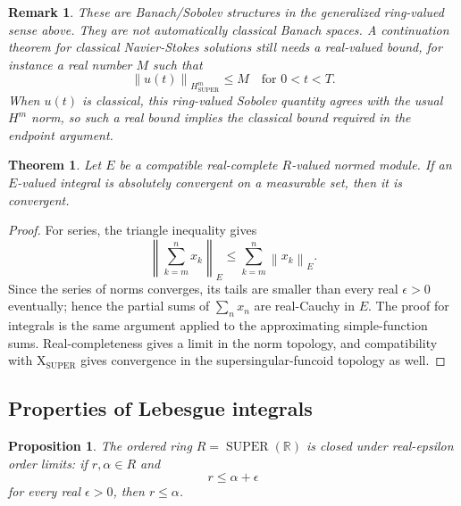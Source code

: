 \documentclass{amsart}
\newtheorem{thm}{Theorem}
\newtheorem{prop}{Proposition}
\newtheorem{rem}{Remark}
\DeclareMathOperator{\SUPER}{SUPER}
\newcommand{\norm}[1]{\left\lVert #1\right\rVert}
\begin{document}
\begin{rem}
These are Banach/Sobolev structures in the generalized ring-valued sense above.
They are not automatically classical Banach spaces.  A continuation theorem for
classical Na\-vi\-er-Sto\-kes solutions still needs a real-valued bound, for
instance a real number $M$ such that
\[
  \norm{u(t)}_{H^m_{\SUPER}}\leq M
  \quad\text{for }0<t<T.
\]
When $u(t)$ is classical, this ring-valued Sobolev quantity agrees with the
usual $H^m$ norm, so such a real bound implies the classical bound required in
the endpoint argument.
\end{rem}

\begin{thm}
Let $E$ be a compatible real-complete $R$-valued normed module.  If an
$E$-valued integral is absolutely convergent on a measurable set, then it is
convergent.
\end{thm}

\begin{proof}
For series, the triangle inequality gives
\[
  \norm{\sum_{k=m}^n x_k}_E
  \leq\sum_{k=m}^n\norm{x_k}_E.
\]
Since the series of norms converges, its tails are smaller than every real
$\epsilon>0$ eventually; hence the partial sums of $\sum_n x_n$ are real-Cauchy
in $E$.  The proof for integrals is the same argument applied to the
approximating simple-function sums.  Real-completeness gives a limit in the
norm topology, and compatibility with $\mathrm{X}_{\SUPER}$ gives convergence
in the supersingular-funcoid topology as well.
\end{proof}

\subsection{Properties of Lebesgue integrals}

\begin{prop}
The ordered ring $R=\SUPER(\mathbb{R})$ is closed under real-epsilon order
limits: if $r,\alpha\in R$ and
\[
  r\leq\alpha+\epsilon
\]
for every real $\epsilon>0$, then $r\leq\alpha$.
\end{prop}
\end{document}
